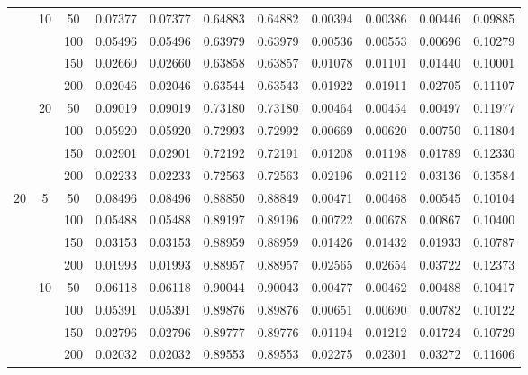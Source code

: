 \documentclass[11pt]{article}
\begin{document}
\begin{center}
\begin{longtable}{|c|c|c|c|c|c|c|c|c|c|c|}
		& \multirow{4}{*}{10} &50  & 0.07377 & 0.07377 & 0.64883 & 0.64882 & 0.00394 & 0.00386 & 0.00446 & 0.09885 \\ \cline{3-11} 
		&                     &100 & 0.05496 & 0.05496 & 0.63979 & 0.63979 & 0.00536 & 0.00553 & 0.00696 & 0.10279 \\  \cline{3-11} 
		&                     &150 & 0.02660 & 0.02660 & 0.63858 & 0.63857 & 0.01078 & 0.01101 & 0.01440 & 0.10001 \\  \cline{3-11} 
		&                     &200 & 0.02046 & 0.02046 & 0.63544 & 0.63543 & 0.01922 & 0.01911 & 0.02705 & 0.11107 \\  \cline{2-11}
		& \multirow{4}{*}{20} &50  & 0.09019 & 0.09019 & 0.73180 & 0.73180 & 0.00464 & 0.00454 & 0.00497 & 0.11977 \\ \cline{3-11} 
		&                     &100 & 0.05920 & 0.05920 & 0.72993 & 0.72992 & 0.00669 & 0.00620 & 0.00750 & 0.11804 \\  \cline{3-11} 
		&                     &150 & 0.02901 & 0.02901 & 0.72192 & 0.72191 & 0.01208 & 0.01198 & 0.01789 & 0.12330 \\  \cline{3-11} 
		&                     &200 & 0.02233 & 0.02233 & 0.72563 & 0.72563 & 0.02196 & 0.02112 & 0.03136 & 0.13584 \\  \hline
		\multirow{12}{*}{$20$}   
		& \multirow{4}{*}{5}  &50  & 0.08496 & 0.08496 & 0.88850 & 0.88849 & 0.00471 & 0.00468 & 0.00545 & 0.10104 \\   \cline{3-11} 
		&                     &100 & 0.05488 & 0.05488 & 0.89197 & 0.89196 & 0.00722 & 0.00678 & 0.00867 & 0.10400 \\   \cline{3-11} 
		&                     &150 & 0.03153 & 0.03153 & 0.88959 & 0.88959 & 0.01426 & 0.01432 & 0.01933 & 0.10787 \\   \cline{3-11} 
		&                     &200 & 0.01993 & 0.01993 & 0.88957 & 0.88957 & 0.02565 & 0.02654 & 0.03722 & 0.12373 \\   \cline{2-11} 
		& \multirow{4}{*}{10} &50  & 0.06118 & 0.06118 & 0.90044 & 0.90043 & 0.00477 & 0.00462 & 0.00488 & 0.10417 \\  \cline{3-11} 
		&                     &100 & 0.05391 & 0.05391 & 0.89876 & 0.89876 & 0.00651 & 0.00690 & 0.00782 & 0.10122 \\   \cline{3-11} 
		&                     &150 & 0.02796 & 0.02796 & 0.89777 & 0.89776 & 0.01194 & 0.01212 & 0.01724 & 0.10729 \\  \cline{3-11} 
		&                     &200 & 0.02032 & 0.02032 & 0.89553 & 0.89553 & 0.02275 & 0.02301 & 0.03272 & 0.11606 \\   \cline{2-11}

\end{longtable}
\end{center}
\end{document}
